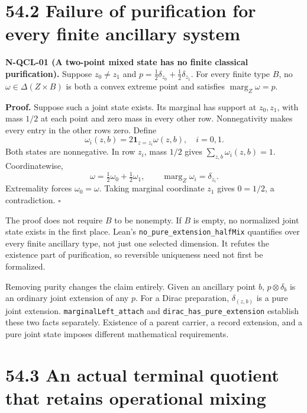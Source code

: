 \documentclass[
  11pt,
  oneside]{book}
\begin{document}
\section{54.2 Failure of purification for every finite ancillary system}

\label{n-qcl-01}{}

\textbf{N-QCL-01 (A two-point mixed state has no finite classical
purification).} Suppose \(z_0\ne z_1\) and
\(p=\tfrac12\delta_{z_0}+\tfrac12\delta_{z_1}\). For every finite type
\(B\), no \(\omega\in\Delta(Z\times B)\) is both a convex extreme point
and satisfies \(\operatorname{marg}_Z\omega=p\).

\textbf{Proof.} Suppose such a joint state exists. Its marginal has
support at \(z_0,z_1\), with mass \(1/2\) at each point and zero mass in
every other row. Nonnegativity makes every entry in the other rows zero.
Define \[
\omega_i(z,b)=2\mathbf1_{z=z_i}\omega(z,b),\quad i=0,1.
\] Both states are nonnegative. In row \(z_i\), mass \(1/2\) gives
\(\sum_{z,b}\omega_i(z,b)=1\). Coordinatewise, \[
\omega=\tfrac12\omega_0+\tfrac12\omega_1,
\qquad \operatorname{marg}_Z\omega_i=\delta_{z_i}.
\] Extremality forces \(\omega_0=\omega\). Taking marginal coordinate
\(z_1\) gives \(0=1/2\), a contradiction. \(\square\)

The proof does not require \(B\) to be nonempty. If \(B\) is empty, no
normalized joint state exists in the first place. Lean's
\texttt{no\_\allowbreak pure\_\allowbreak extension\_\allowbreak half\allowbreak Mix} quantifies over every finite
ancillary type, not just one selected dimension. It refutes the
existence part of purification, so reversible uniqueness need not first
be formalized.

Removing purity changes the claim entirely. Given an ancillary point
\(b\), \(p\otimes\delta_b\) is an ordinary joint extension of any \(p\).
For a Dirac preparation, \(\delta_{(z,b)}\) is a pure joint extension.
\texttt{marginal\allowbreak Left\_\allowbreak attach} and \texttt{dirac\_\allowbreak has\_\allowbreak pure\_\allowbreak extension}
establish these two facts separately. Existence of a parent carrier, a
record extension, and a pure joint state imposes different mathematical
requirements.

\section{54.3 An actual terminal quotient that retains operational
mixing}
\end{document}
